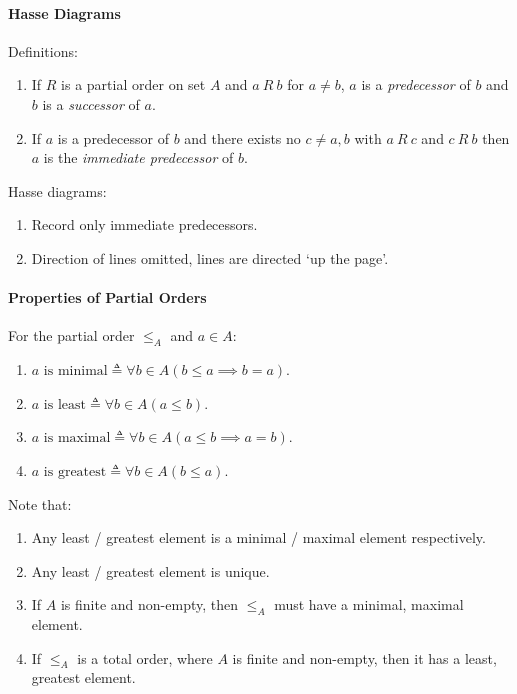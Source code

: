 \documentclass[10pt,twoside,twocolumn]{article}
\begin{document}
\paragraph{Hasse Diagrams}

Definitions:
\begin{enumerate}
\item If $R$ is a partial order on set $A$ and $a\:R\:b$ for $a\neq b$,
$a$ is a \emph{predecessor} of $b$ and $b$ is a \emph{successor}
of $a$.
\item If $a$ is a predecessor of $b$ and there exists no $c\neq a,b$
with $a\:R\:c$ and $c\:R\:b$ then $a$ is the \emph{immediate predecessor}
of $b$.
\end{enumerate}
Hasse diagrams:
\begin{enumerate}
\item Record only immediate predecessors.
\item Direction of lines omitted, lines are directed `up the page'.
\end{enumerate}

\paragraph{Properties of Partial Orders}

For the partial order $\leq_{A}$ and $a\in A$:
\begin{enumerate}
\item $a\mbox{ is minimal}\triangleq\forall b\in A\left(b\leq a\implies b=a\right)$.
\item $a\mbox{ is least}\triangleq\forall b\in A\left(a\leq b\right)$.
\item $a\mbox{ is maximal}\triangleq\forall b\in A\left(a\leq b\implies a=b\right)$.
\item $a\mbox{ is greatest}\triangleq\forall b\in A\left(b\leq a\right)$.
\end{enumerate}
Note that:
\begin{enumerate}
\item Any least / greatest element is a minimal / maximal element respectively.
\item Any least / greatest element is unique.
\item If $A$ is finite and non-empty, then $\leq_{A}$ must have a minimal,
maximal element.
\item If $\leq_{A}$ is a total order, where $A$ is finite and non-empty,
then it has a least, greatest element.
\end{enumerate}
\end{document}
